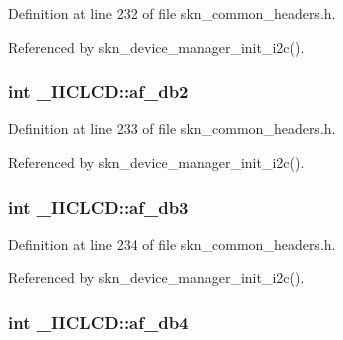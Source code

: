 Definition at line 232 of file skn\+\_\+common\+\_\+headers.\+h.



Referenced by skn\+\_\+device\+\_\+manager\+\_\+init\+\_\+i2c().

\hypertarget{struct___i_i_c_l_c_d_a7b88e6903c8fb93882c396261ffe40b5}{
\subsubsection[{af\+\_\+db2}]{\setlength{\rightskip}{0pt plus 5cm}int \+\_\+\+I\+I\+C\+L\+C\+D\+::af\+\_\+db2}}\label{struct___i_i_c_l_c_d_a7b88e6903c8fb93882c396261ffe40b5}


Definition at line 233 of file skn\+\_\+common\+\_\+headers.\+h.



Referenced by skn\+\_\+device\+\_\+manager\+\_\+init\+\_\+i2c().

\hypertarget{struct___i_i_c_l_c_d_a26f362cb78eb2227a14706e9c992a066}{
\subsubsection[{af\+\_\+db3}]{\setlength{\rightskip}{0pt plus 5cm}int \+\_\+\+I\+I\+C\+L\+C\+D\+::af\+\_\+db3}}\label{struct___i_i_c_l_c_d_a26f362cb78eb2227a14706e9c992a066}


Definition at line 234 of file skn\+\_\+common\+\_\+headers.\+h.



Referenced by skn\+\_\+device\+\_\+manager\+\_\+init\+\_\+i2c().

\hypertarget{struct___i_i_c_l_c_d_adbfc88b661d5da527aad6f5bcd45a85c}{
\subsubsection[{af\+\_\+db4}]{\setlength{\rightskip}{0pt plus 5cm}int \+\_\+\+I\+I\+C\+L\+C\+D\+::af\+\_\+db4}}\label{struct___i_i_c_l_c_d_adbfc88b661d5da527aad6f5bcd45a85c}


